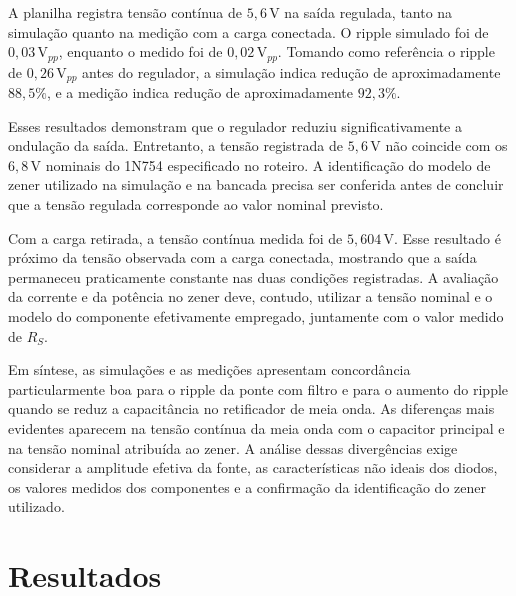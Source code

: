 \documentclass[11pt,a4paper]{article}
\begin{document}
A planilha registra tensão contínua de $5{,}6\,\text{V}$ na saída regulada, tanto na simulação quanto na medição com a carga conectada. O ripple simulado foi de $0{,}03\,\text{V}_{pp}$, enquanto o medido foi de $0{,}02\,\text{V}_{pp}$. Tomando como referência o ripple de $0{,}26\,\text{V}_{pp}$ antes do regulador, a simulação indica redução de aproximadamente $88{,}5\%$, e a medição indica redução de aproximadamente $92{,}3\%$.

Esses resultados demonstram que o regulador reduziu significativamente a ondulação da saída. Entretanto, a tensão registrada de $5{,}6\,\text{V}$ não coincide com os $6{,}8\,\text{V}$ nominais do 1N754 especificado no roteiro. A identificação do modelo de zener utilizado na simulação e na bancada precisa ser conferida antes de concluir que a tensão regulada corresponde ao valor nominal previsto.

Com a carga retirada, a tensão contínua medida foi de $5{,}604\,\text{V}$. Esse resultado é próximo da tensão observada com a carga conectada, mostrando que a saída permaneceu praticamente constante nas duas condições registradas. A avaliação da corrente e da potência no zener deve, contudo, utilizar a tensão nominal e o modelo do componente efetivamente empregado, juntamente com o valor medido de $R_S$.

Em síntese, as simulações e as medições apresentam concordância particularmente boa para o ripple da ponte com filtro e para o aumento do ripple quando se reduz a capacitância no retificador de meia onda. As diferenças mais evidentes aparecem na tensão contínua da meia onda com o capacitor principal e na tensão nominal atribuída ao zener. A análise dessas divergências exige considerar a amplitude efetiva da fonte, as características não ideais dos diodos, os valores medidos dos componentes e a confirmação da identificação do zener utilizado.





\section{Resultados}
\end{document}
